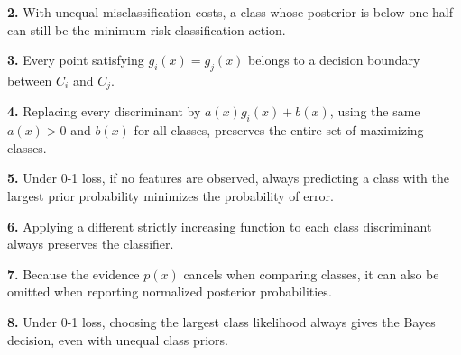 \documentclass[11pt,a4paper]{article}
\begin{document}
\par\noindent\begin{minipage}{\linewidth}
\textbf{2.} With unequal misclassification costs, a class whose posterior is below one half can still be the minimum-risk classification action.
\end{minipage}\par\vspace{3mm}
\par\noindent\begin{minipage}{\linewidth}
\textbf{3.} Every point satisfying \(g_i(x)=g_j(x)\) belongs to a decision boundary between \(C_i\) and \(C_j\).
\end{minipage}\par\vspace{3mm}
\par\noindent\begin{minipage}{\linewidth}
\textbf{4.} Replacing every discriminant by \(a(x)g_i(x)+b(x)\), using the same \(a(x)>0\) and \(b(x)\) for all classes, preserves the entire set of maximizing classes.
\end{minipage}\par\vspace{3mm}
\par\noindent\begin{minipage}{\linewidth}
\textbf{5.} Under 0-1 loss, if no features are observed, always predicting a class with the largest prior probability minimizes the probability of error.
\end{minipage}\par\vspace{3mm}
\par\noindent\begin{minipage}{\linewidth}
\textbf{6.} Applying a different strictly increasing function to each class discriminant always preserves the classifier.
\end{minipage}\par\vspace{3mm}
\par\noindent\begin{minipage}{\linewidth}
\textbf{7.} Because the evidence \(p(x)\) cancels when comparing classes, it can also be omitted when reporting normalized posterior probabilities.
\end{minipage}\par\vspace{3mm}
\par\noindent\begin{minipage}{\linewidth}
\textbf{8.} Under 0-1 loss, choosing the largest class likelihood always gives the Bayes decision, even with unequal class priors.
\end{minipage}\par\vspace{3mm}
\end{document}
